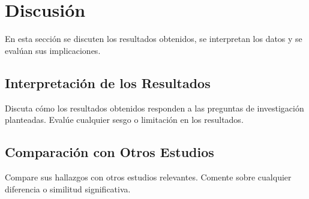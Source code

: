 \section{Discusión}

En esta sección se discuten los resultados obtenidos, se interpretan los datos
y se evalúan sus implicaciones.

\subsection{Interpretación de los Resultados}

Discuta cómo los resultados obtenidos responden a las preguntas de
investigación planteadas. Evalúe cualquier sesgo o limitación en los
resultados.

\subsection{Comparación con Otros Estudios}

Compare sus hallazgos con otros estudios relevantes. Comente sobre cualquier
diferencia o similitud significativa.
